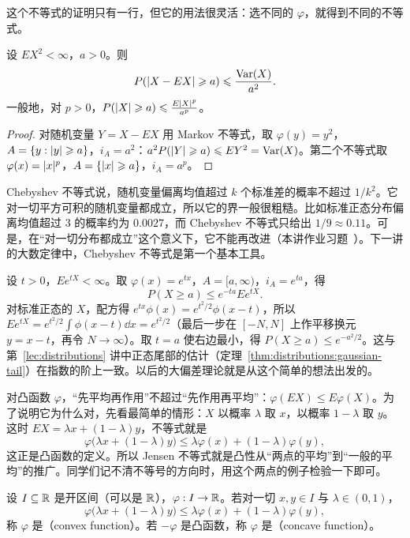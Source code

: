 这个不等式的证明只有一行，但它的用法很灵活：选不同的 $\varphi$，就得到不同的不等式。

\begin{corollary}\label{cor:expectation:chebyshev}
设 $EX^2<\infty$，$a>0$。则
\[
P(\lvert X-EX\rvert\geqslant a)\leqslant\frac{\operatorname{Var}(X)}{a^2}.
\]
一般地，对 $p>0$，$P(\lvert X\rvert\geqslant a)\leqslant\frac{E\lvert X\rvert^p}{a^p}$。
\end{corollary}
\begin{proof}
对随机变量 $Y=X-EX$ 用 Markov 不等式，取 $\varphi(y)=y^2$，$A=\{y:\lvert y\rvert\geqslant a\}$，$i_A=a^2$：$a^2P(\lvert Y\rvert\geqslant a)\leqslant EY^2=\operatorname{Var}(X)$。第二个不等式取 $\varphi(x)=\lvert x\rvert^p$，$A=\{\lvert x\rvert\geqslant a\}$，$i_A=a^p$。
\end{proof}

Chebyshev 不等式说，随机变量偏离均值超过 $k$ 个标准差的概率不超过 $1/k^2$。它对一切平方可积的随机变量都成立，所以它的界一般很粗糙。比如标准正态分布偏离均值超过 $3$ 的概率约为 $0.0027$，而 Chebyshev 不等式只给出 $1/9\approx0.11$。可是，在“对一切分布都成立”这个意义下，它不能再改进（本讲作业习题~）。下一讲的大数定律中，Chebyshev 不等式是第一个基本工具。

\begin{example}
设 $t>0$，$Ee^{tX}<\infty$。取 $\varphi(x)=e^{tx}$，$A=[a,\infty)$，$i_A=e^{ta}$，得
\[
P(X\geqslant a)\leqslant e^{-ta}Ee^{tX}.
\]
对标准正态的 $X$，配方得 $e^{tx}\phi(x)=e^{t^2/2}\phi(x-t)$，所以 $Ee^{tX}=e^{t^2/2}\int\phi(x-t)\dd x=e^{t^2/2}$（最后一步在 $[-N,N]$ 上作平移换元 $y=x-t$，再令 $N\to\infty$）。取 $t=a$ 使右边最小，得 $P(X\geqslant a)\leqslant e^{-a^2/2}$。这与第~\ref{lec:distributions} 讲中正态尾部的估计（定理~\ref{thm:distributions:gaussian-tail}）在指数的阶上一致。以后的大偏差理论就是从这个简单的想法出发的。
\end{example}


对凸函数 $\varphi$，“先平均再作用”不超过“先作用再平均”：$\varphi(EX)\leqslant E\varphi(X)$。为了说明它为什么对，先看最简单的情形：$X$ 以概率 $\lambda$ 取 $x$，以概率 $1-\lambda$ 取 $y$。这时 $EX=\lambda x+(1-\lambda)y$，不等式就是
\[
\varphi\bigl(\lambda x+(1-\lambda)y\bigr)\leqslant\lambda\varphi(x)+(1-\lambda)\varphi(y),
\]
这正是凸函数的定义。所以 Jensen 不等式就是凸性从“两点的平均”到“一般的平均”的推广。同学们记不清不等号的方向时，用这个两点的例子检验一下即可。

\begin{definition}[凸函数]\label{def:expectation:convex}
设 $I\subseteq\mathbb{R}$ 是开区间（可以是 $\mathbb{R}$），$\varphi:I\to\mathbb{R}$。若对一切 $x,y\in I$ 与 $\lambda\in(0,1)$，
\[
\varphi\bigl(\lambda x+(1-\lambda)y\bigr)\leqslant\lambda\varphi(x)+(1-\lambda)\varphi(y),
\]
称 $\varphi$ 是（convex function）。若 $-\varphi$ 是凸函数，称 $\varphi$ 是（concave function）。
\end{definition}

